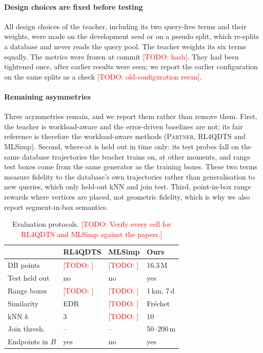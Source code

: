 \documentclass[conference]{IEEEtran}
\newcommand{\todo}[1]{\textcolor{red}{[TODO: #1]}}
\begin{document}
\paragraph{Design choices are fixed before testing}
All design choices of the teacher, including its two query-free terms and their weights, were made
on the development seed or on a pseudo split, which re-splits a database and never reads the query
pool. The teacher weights its six terms equally. The metrics were frozen at commit
\todo{hash}. They had been tightened once, after earlier results were seen; we report the earlier
configuration on the same splits as a check \todo{old-configuration rerun}.

\paragraph{Remaining asymmetries}
Three asymmetries remain, and we report them rather than remove them. First, the teacher is
workload-aware and the error-driven baselines are not; its fair reference is therefore the
workload-aware methods (\textsc{Partner}, RL4QDTS and MLSimp). Second, where-at is held out in time
only: its test probes fall on the same database trajectories the teacher trains on, at other
moments, and range test boxes come from the same generator as the training boxes. These two terms
measure fidelity to the database's own trajectories rather than generalisation to new queries,
which only held-out kNN and join test. Third, point-in-box range rewards where vertices are placed,
not geometric fidelity, which is why we also report segment-in-box semantics.

\begin{table}[t]
\centering
\caption{Evaluation protocols. \todo{Verify every cell for RL4QDTS and MLSimp against the papers.}}
\label{tab:protocols}
\small
\begin{tabular}{@{}llll@{}}
\toprule
 & RL4QDTS & MLSimp & Ours \\
\midrule
DB points & \todo{} & \todo{} & 16.3\,M \\
Test held out & no & no & yes \\
Range boxes & \todo{} & \todo{} & 1\,km, 7\,d \\
Similarity & EDR & \todo{} & Fr\'echet \\
kNN $k$ & 3 & \todo{} & 10 \\
Join thresh. & -- & -- & 50--200\,m \\
Endpoints in $B$ & yes & no & yes \\
\bottomrule
\end{tabular}
\end{table}
\end{document}
